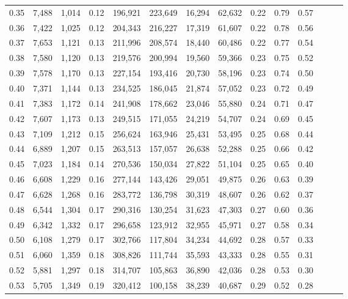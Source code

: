 \begin{tabular}{rrrrrrrrrrrrrr}
0.35 &  7,488 &  1,014 &  0.12 &  196,921 &  223,649 &  16,294 &  62,632 &  0.22 &  0.79 &      0.57 \\
0.36 &  7,422 &  1,025 &  0.12 &  204,343 &  216,227 &  17,319 &  61,607 &  0.22 &  0.78 &      0.56 \\
0.37 &  7,653 &  1,121 &  0.13 &  211,996 &  208,574 &  18,440 &  60,486 &  0.22 &  0.77 &      0.54 \\
0.38 &  7,580 &  1,120 &  0.13 &  219,576 &  200,994 &  19,560 &  59,366 &  0.23 &  0.75 &      0.52 \\
0.39 &  7,578 &  1,170 &  0.13 &  227,154 &  193,416 &  20,730 &  58,196 &  0.23 &  0.74 &      0.50 \\
0.40 &  7,371 &  1,144 &  0.13 &  234,525 &  186,045 &  21,874 &  57,052 &  0.23 &  0.72 &      0.49 \\
0.41 &  7,383 &  1,172 &  0.14 &  241,908 &  178,662 &  23,046 &  55,880 &  0.24 &  0.71 &      0.47 \\
0.42 &  7,607 &  1,173 &  0.13 &  249,515 &  171,055 &  24,219 &  54,707 &  0.24 &  0.69 &      0.45 \\
0.43 &  7,109 &  1,212 &  0.15 &  256,624 &  163,946 &  25,431 &  53,495 &  0.25 &  0.68 &      0.44 \\
0.44 &  6,889 &  1,207 &  0.15 &  263,513 &  157,057 &  26,638 &  52,288 &  0.25 &  0.66 &      0.42 \\
0.45 &  7,023 &  1,184 &  0.14 &  270,536 &  150,034 &  27,822 &  51,104 &  0.25 &  0.65 &      0.40 \\
0.46 &  6,608 &  1,229 &  0.16 &  277,144 &  143,426 &  29,051 &  49,875 &  0.26 &  0.63 &      0.39 \\
0.47 &  6,628 &  1,268 &  0.16 &  283,772 &  136,798 &  30,319 &  48,607 &  0.26 &  0.62 &      0.37 \\
0.48 &  6,544 &  1,304 &  0.17 &  290,316 &  130,254 &  31,623 &  47,303 &  0.27 &  0.60 &      0.36 \\
0.49 &  6,342 &  1,332 &  0.17 &  296,658 &  123,912 &  32,955 &  45,971 &  0.27 &  0.58 &      0.34 \\
0.50 &  6,108 &  1,279 &  0.17 &  302,766 &  117,804 &  34,234 &  44,692 &  0.28 &  0.57 &      0.33 \\
0.51 &  6,060 &  1,359 &  0.18 &  308,826 &  111,744 &  35,593 &  43,333 &  0.28 &  0.55 &      0.31 \\
0.52 &  5,881 &  1,297 &  0.18 &  314,707 &  105,863 &  36,890 &  42,036 &  0.28 &  0.53 &      0.30 \\
0.53 &  5,705 &  1,349 &  0.19 &  320,412 &  100,158 &  38,239 &  40,687 &  0.29 &  0.52 &      0.28 \\

\end{tabular}
